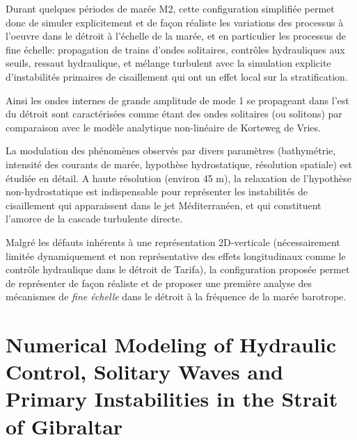 Durant quelques périodes de marée M2, cette configuration simplifiée  permet donc de simuler explicitement et de façon réaliste les variations des processus à l'oeuvre dans le détroit à l'échelle de la marée, et en particulier les processus de fine échelle: propagation de trains d'ondes solitaires, contrôles hydrauliques aux seuils, ressaut hydraulique, et mélange turbulent avec la simulation explicite d'instabilités primaires de cisaillement qui ont un effet local sur la stratification. 

Ainsi les ondes internes de grande amplitude de mode 1 se propageant dans l'est du détroit sont caractérisées comme étant des ondes solitaires (ou solitons) par comparaison avec le modèle analytique non-linéaire de Korteweg de Vries. 

La modulation des phénomènes observés par divers paramètres (bathymétrie, intensité des courants de marée, hypothèse hydrostatique, résolution spatiale) est étudiée en détail. A haute résolution (environ 45 m), la relaxation de l'hypothèse non-hydrostatique est indispensable pour représenter les instabilités de cisaillement qui apparaissent dans le jet Méditerranéen, et qui constituent l'amorce de la cascade turbulente directe.

Malgré les défauts inhérents à une représentation 2D-verticale (nécessairement limitée dynamiquement et non représentative des effets longitudinaux comme le contrôle hydraulique dans le détroit de Tarifa), la configuration proposée permet de représenter de façon réaliste et de proposer une première analyse des mécanismes de \textit{fine échelle} dans le détroit à la fréquence de la marée barotrope.



\section{Numerical Modeling of Hydraulic Control, Solitary Waves and Primary Instabilities in the Strait of Gibraltar}
\label{sectionSim2D}

